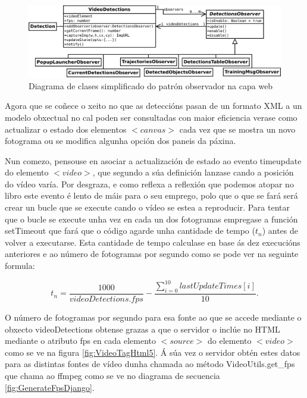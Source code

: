         \begin{figure}[htp]
        \begin{center}
            \includegraphics[scale=0.35]{figures/observerPattern.pdf}
            \caption{Diagrama de clases simplificado do patrón observador na capa web}
        \label{fig:observerPattern}
        \end{center}
        \end{figure}
        
        Agora que se coñece o xeito no que as deteccións pasan de un formato XML a un modelo obxectual 
        no cal poden ser consultadas con maior eficiencia verase como actualizar o estado dos elementos
        $<canvas>$ cada vez que se mostra un novo fotograma ou se modifica algunha opción dos paneis da
        páxina.
        
        Nun comezo, pensouse en asociar a actualización de estado ao evento timeupdate do elemento 
        $<video>$, que segundo a súa definición lanzase cando a posición do vídeo varía. Por desgraza, 
        e como reflexa a reflexión que podemos atopar no libro \cite[Capítulo 6.1]{video-con-html5}
        este evento é lento de máis para o seu emprego, polo que o que se fará será
        crear un bucle que se execute cando o vídeo se estea a reproducir. Para tentar que o bucle se 
        execute unha vez en cada un dos fotogramas empregase a función setTimeout que fará que o 
        código agarde unha cantidade de tempo ($t_n$) antes de volver a executarse. Esta cantidade de tempo 
        calculase en base ás dez execucións anteriores e ao número de fotogramas por segundo como se
        pode ver na seguinte formula:
        
        \begin{equation}
         t_n = \dfrac{1000}{videoDetections.fps} - \dfrac{\sum_{i=0}^{10} lastUpdateTimes[i]}{10}.
        \end{equation}

        O número de fotogramas por segundo para esa fonte ao que se accede mediante o obxecto 
        videoDetections obtense grazas a que o servidor o inclúe no HTML mediante o atributo fps en 
        cada elemento $<source>$ do elemento $<video>$ como se ve na figura \ref{fig:VideoTagHtml5}.
        Á súa vez o servidor obtén estes datos para as distintas fontes de vídeo dunha chamada ao
        método VideoUtils.get\_fps que chama ao ffmpeg como se ve no diagrama de secuencia 
        \ref{fig:GenerateFpsDjango}.
        
